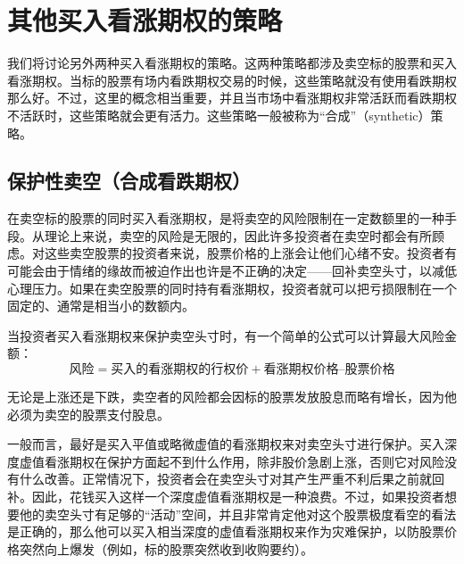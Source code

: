 \chapter{其他买入看涨期权的策略}
我们将讨论另外两种买入看涨期权的策略。这两种策略都涉及卖空标的股票和买入看涨期权。当标的股票有场内看跌期权交易的时候，这些策略就没有使用看跌期权那么好。不过，这里的概念相当重要，并且当市场中看涨期权非常活跃而看跌期权不活跃时，这些策略就会更有活力。这些策略一般被称为“合成”（synthetic）策略。
\section{保护性卖空（合成看跌期权）}
在卖空标的股票的同时买入看涨期权，是将卖空的风险限制在一定数额里的一种手段。从理论上来说，卖空的风险是无限的，因此许多投资者在卖空时都会有所顾虑。对这些卖空股票的投资者来说，股票价格的上涨会让他们心绪不安。投资者有可能会由于情绪的缘故而被迫作出也许是不正确的决定——回补卖空头寸，以减低心理压力。如果在卖空股票的同时持有看涨期权，投资者就可以把亏损限制在一个固定的、通常是相当小的数额内。

当投资者买入看涨期权来保护卖空头寸时，有一个简单的公式可以计算最大风险金额：
\begin{equation}
    \text{风险}=\text{买入的看涨期权的行权价}+\text{看涨期权价格}–\text{股票价格}
\end{equation}

无论是上涨还是下跌，卖空者的风险都会因标的股票发放股息而略有增长，因为他必须为卖空的股票支付股息。

一般而言，最好是买入平值或略微虚值的看涨期权来对卖空头寸进行保护。买入深度虚值看涨期权在保护方面起不到什么作用，除非股价急剧上涨，否则它对风险没有什么改善。正常情况下，投资者会在卖空头寸对其产生严重不利后果之前就回补。因此，花钱买入这样一个深度虚值看涨期权是一种浪费。不过，如果投资者想要他的卖空头寸有足够的“活动”空间，并且非常肯定他对这个股票极度看空的看法是正确的，那么他可以买入相当深度的虚值看涨期权来作为灾难保护，以防股票价格突然向上爆发（例如，标的股票突然收到收购要约）。

